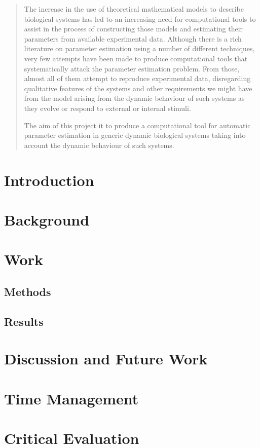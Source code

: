 \documentclass[12pt,a4paper,titlepage]{article}
\begin{document}

\begin{abstract}
The increase in the use of theoretical mathematical models to describe biological systems has led to an increasing need for computational tools to assist in the process of constructing those models and estimating their parameters from available experimental data. Although there is a rich literature on parameter estimation using a number of different techniques, very few attempts have been made to produce computational tools that systematically attack the parameter estimation problem. From those, almost all of them attempt to reproduce experimental data, disregarding qualitative features of the systems and other requirements we might have from the model arising from the dynamic behaviour of such systems as they evolve or respond to external or internal stimuli.

The aim of this project it to produce a computational tool for automatic parameter estimation in generic dynamic biological systems taking into account the dynamic behaviour of such systems.
\end{abstract}
\tableofcontents
\newpage
\section{Introduction}


\section{Background}

\section{Work}

\subsection{Methods}

\subsection{Results}

\section{Discussion and Future Work}

\newpage

\appendix
\section{Time Management}
\section{Critical Evaluation}
\end{document}
